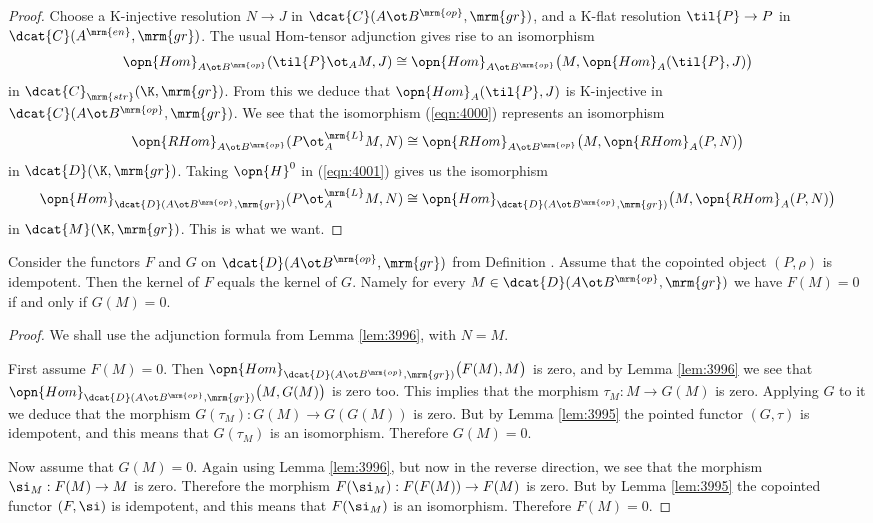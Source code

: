 \begin{proof}
Choose a K-injective resolution $N \to J$ in 
$\dcat{C}(A \ot B^{\mrm{op}}, \mrm{gr})$,
and a K-flat resolution $\til{P} \to P$ in $\dcat{C}(A^{\mrm{en}}, \mrm{gr})$.
The usual Hom-tensor adjunction gives rise to an isomorphism 
\begin{equation} \label{eqn:4000}
\opn{Hom}_{A \ot B^{\mrm{op}}}(\til{P} \ot_A M, J) \cong 
\opn{Hom}_{A \ot B^{\mrm{op}}} \bigl( M, \opn{Hom}_{A}(\til{P}, J) \bigr)
\end{equation}
in $\dcat{C}_{\mrm{str}}(\K, \mrm{gr})$. From this we deduce that 
$\opn{Hom}_{A}(\til{P}, J)$
is K-injective in \lb $\dcat{C}(A \ot B^{\mrm{op}}, \mrm{gr})$.
We see that the isomorphism (\ref{eqn:4000}) represents an isomorphism 
\begin{equation} \label{eqn:4001}
\opn{RHom}_{A \ot B^{\mrm{op}}}(P \ot_A^{\mrm{L}} M, N) \cong 
\opn{RHom}_{A \ot B^{\mrm{op}}} \bigl( M, \opn{RHom}_{A}(P, N) \bigr)
\end{equation}
in $\dcat{D}(\K, \mrm{gr})$. Taking $\opn{H}^0$ in (\ref{eqn:4001}) 
gives us the isomorphism 
\[ \opn{Hom}_{\dcat{D}(A \ot B^{\mrm{op}}, \mrm{gr})}(P \ot_A^{\mrm{L}} M, N) 
\cong 
\opn{Hom}_{\dcat{D}(A \ot B^{\mrm{op}}, \mrm{gr})}
\bigl( M, \opn{RHom}_{A}(P, N) \bigr) \]
in $\dcat{M}(\K, \mrm{gr})$. This is what we want. 
\end{proof}

\begin{lem} \label{lem:4000}
Consider the functors $F$ and $G$ on $\dcat{D}(A \ot B^{\mrm{op}}, \mrm{gr})$ 
from Definition \tup{\ref{dfn:3996}}.  
Assume that the copointed object $(P, \rho)$ is idempotent. 
Then the kernel of $F$ equals the kernel 
of $G$. Namely for every $M \in \dcat{D}(A \ot B^{\mrm{op}}, \mrm{gr})$ we have 
$F(M) = 0$ if and only if $G(M) = 0$. 
\end{lem}

\begin{proof}
We shall use the adjunction formula from Lemma \ref{lem:3996}, with $N = M$. 

First assume $F(M) = 0$. Then 
$\opn{Hom}_{\dcat{D}(A \ot B^{\mrm{op}}, \mrm{gr})} \bigl( F(M), M \bigr)$
is zero, and by Lemma \ref{lem:3996} we see that 
$\opn{Hom}_{\dcat{D}(A \ot B^{\mrm{op}}, \mrm{gr})} \bigl( M, G(M) \bigr)$ 
is zero too. This implies that the morphism $\tau_M : M \to G(M)$ is zero.
Applying $G$ to it we deduce that the morphism 
$G(\tau_M) : G(M) \to G(G(M))$
is zero. But by Lemma \ref{lem:3995} the pointed functor 
$(G, \tau)$ is idempotent, and this means that $G(\tau_M)$ is an isomorphism. 
Therefore $G(M) = 0$. 

Now assume that $G(M) = 0$. Again using Lemma \ref{lem:3996}, but now in 
the reverse direction, we see that the morphism
$\si_M : F(M) \to M$ is zero. Therefore the morphism
$F(\si_M) : F(F(M)) \to F(M)$
is zero. But by Lemma \ref{lem:3995} the copointed functor 
$(F, \si)$ is idempotent, and this means that $F(\si_M)$ is an isomorphism. 
Therefore $F(M) = 0$. 
\end{proof}

